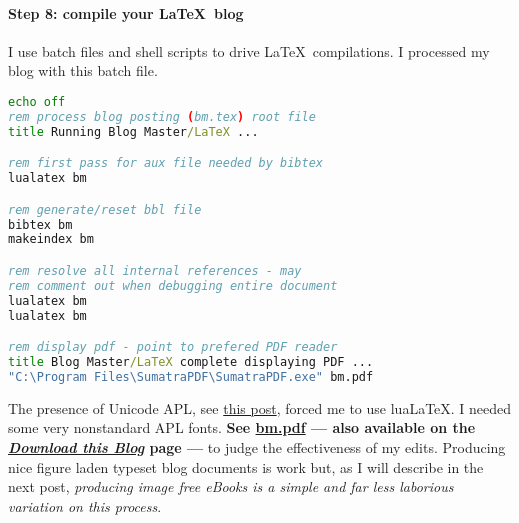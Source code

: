 \paragraph{Step 8: compile your \LaTeX\ blog}

I use batch files and shell scripts to drive \LaTeX\ compilations. I
processed my blog with this batch file.

\begin{lstlisting}[language=bat,frame=single,framerule=0pt,label=lst:scr2518X2]
echo off
rem process blog posting (bm.tex) root file
title Running Blog Master/LaTeX ...

rem first pass for aux file needed by bibtex
lualatex bm

rem generate/reset bbl file
bibtex bm
makeindex bm

rem resolve all internal references - may
rem comment out when debugging entire document
lualatex bm
lualatex bm

rem display pdf - point to prefered PDF reader
title Blog Master/LaTeX complete displaying PDF ...
"C:\Program Files\SumatraPDF\SumatraPDF.exe" bm.pdf
\end{lstlisting}

The presence of Unicode APL, see
\href{http://bakerjd99.wordpress.com/2010/11/12/the-return-of-apl-fingers-2/}{this
post}, forced me to use lua\LaTeX. I needed some very
nonstandard APL fonts. \textbf{See
\href{http://www.box.com/s/8yvm27ag9agtm32nfahd}{bm.pdf} --- also
available on the \href{http://bakerjd99.wordpress.com/download-this-blog/}{\emph{Download this Blog}} page ---} to judge the
effectiveness of my edits. Producing nice figure laden typeset blog
documents is work but, as I will describe in the next post,
\emph{producing image free eBooks is a simple and far less laborious
variation on this process}.





%